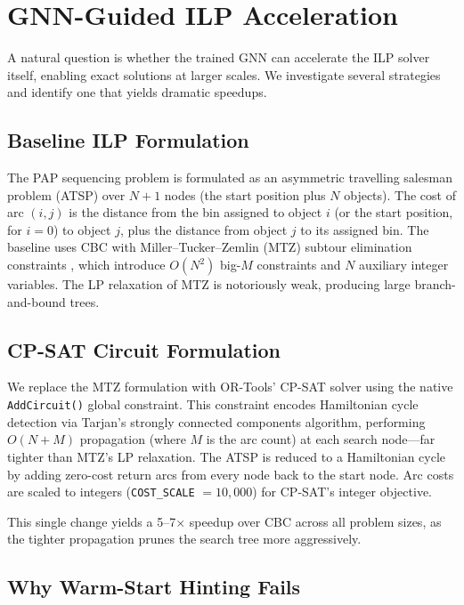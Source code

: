\documentclass[conference]{IEEEtran}
\begin{document}
\section{GNN-Guided ILP Acceleration}\label{sec:ilp_accel}

A natural question is whether the trained GNN can accelerate the ILP solver itself, enabling exact solutions at larger scales. We investigate several strategies and identify one that yields dramatic speedups.

\subsection{Baseline ILP Formulation}

The PAP sequencing problem is formulated as an asymmetric travelling salesman problem (ATSP) over $N{+}1$ nodes (the start position plus $N$ objects). The cost of arc $(i, j)$ is the distance from the bin assigned to object $i$ (or the start position, for $i{=}0$) to object $j$, plus the distance from object $j$ to its assigned bin. The baseline uses CBC \cite{ortools} with Miller--Tucker--Zemlin (MTZ) subtour elimination constraints \cite{mtz1960}, which introduce $O(N^2)$ big-$M$ constraints and $N$ auxiliary integer variables. The LP relaxation of MTZ is notoriously weak, producing large branch-and-bound trees.

\subsection{CP-SAT Circuit Formulation}

We replace the MTZ formulation with OR-Tools' CP-SAT solver using the native \texttt{AddCircuit()} global constraint. This constraint encodes Hamiltonian cycle detection via Tarjan's strongly connected components algorithm, performing $O(N{+}M)$ propagation (where $M$ is the arc count) at each search node---far tighter than MTZ's LP relaxation. The ATSP is reduced to a Hamiltonian cycle by adding zero-cost return arcs from every node back to the start node. Arc costs are scaled to integers (\texttt{COST\_SCALE} $= 10{,}000$) for CP-SAT's integer objective.

This single change yields a 5--7$\times$ speedup over CBC across all problem sizes, as the tighter propagation prunes the search tree more aggressively.

\subsection{Why Warm-Start Hinting Fails}\label{sec:hint_fail}
\end{document}
